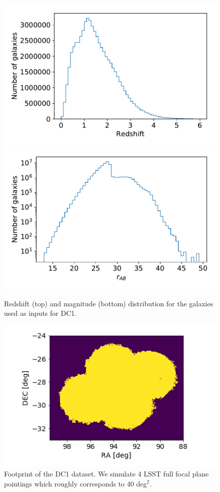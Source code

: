 \documentclass[twocolumn]{aastex62}
\begin{document}
\begin{figure}
\centering
\includegraphics[width=0.9\columnwidth]{N_z_DC1.pdf}
\includegraphics[width=0.9\columnwidth]{N_m_DC1.pdf}
\caption{Redshift (top) and magnitude (bottom) distribution for the galaxies used as inputs for DC1.}
\label{fig:catalog_plots}
\end{figure}

\begin{figure}
\centering
\includegraphics[width=0.9\columnwidth]{footprint.png}
\caption{Footprint of the DC1 dataset. We simulate 4 LSST full focal plane pointings which roughly corresponds to 40 deg$^{2}$.}
\label{fig:footprint}
\end{figure}
\end{document}
